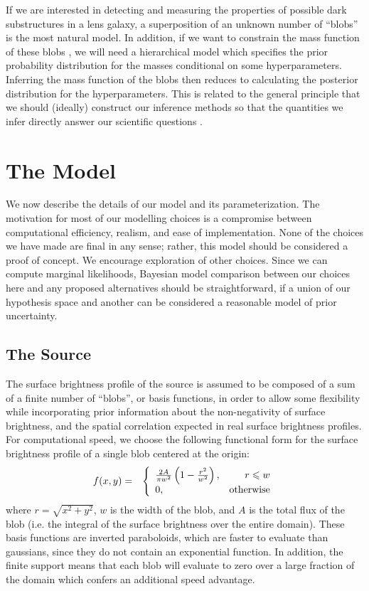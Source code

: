 \documentclass[useAMS,usenatbib]{mn2e}
\begin{document}
If we are interested in detecting and measuring the properties of
possible dark substructures in a lens galaxy,
a superposition of an unknown number of ``blobs'' is the
most natural model. In addition, if we want to constrain the mass function of
these blobs \citep[e.g.][]{2009MNRAS.400.1583V, 2014MNRAS.442.2017V},
we will need a hierarchical model which specifies the prior probability
distribution for the masses conditional on some hyperparameters. Inferring the
mass function of the blobs then reduces to calculating the posterior
distribution for the hyperparameters. This is related to the general principle
that we should (ideally) construct our inference methods so that the
quantities we infer directly answer our scientific questions
\citep{2015arXiv150507840A, 2015ApJ...807...87S, pancoast}.

\section{The Model}
We now describe the details of our model and its parameterization. The
motivation for most of our modelling choices is a compromise between
computational efficiency, realism, and ease of implementation. None of the
choices we have made are final in any sense; rather, this model should be
considered a proof of concept. We encourage exploration of
other choices. Since we can compute marginal likelihoods, Bayesian model
comparison between our choices here and any proposed alternatives should be
straightforward, if a union of our hypothesis space and another
can be considered a reasonable model of prior uncertainty.

\subsection{The Source}
The surface brightness profile of the source is assumed to be composed of
a sum of a finite number of ``blobs'', or basis functions, in order to
allow some flexibility while incorporating prior information about the
non-negativity of surface brightness, and the spatial correlation expected
in real surface brightness profiles.
For computational speed, we choose the following
functional form for the surface brightness profile
of a single blob centered at the origin:
\begin{eqnarray}
f(x, y) &=& \left\{
\begin{array}{lr}
\frac{2A}{\pi w^2}\left(1 - \frac{r^2}{w^2}\right), & r \leq w\\
0, & \textnormal{otherwise}
\end{array}
\right.
\end{eqnarray}
where $r = \sqrt{x^2 + y^2}$, $w$ is the width of the blob, and $A$ is the
total flux of the blob (i.e. the integral of the surface brightness over the
entire domain).
These basis functions are inverted paraboloids, which are faster to evaluate
than gaussians, since they do not
contain an exponential function. In addition, the finite support means that
each blob will evaluate to zero over a large fraction of the domain which
confers an additional speed advantage.
\end{document}
